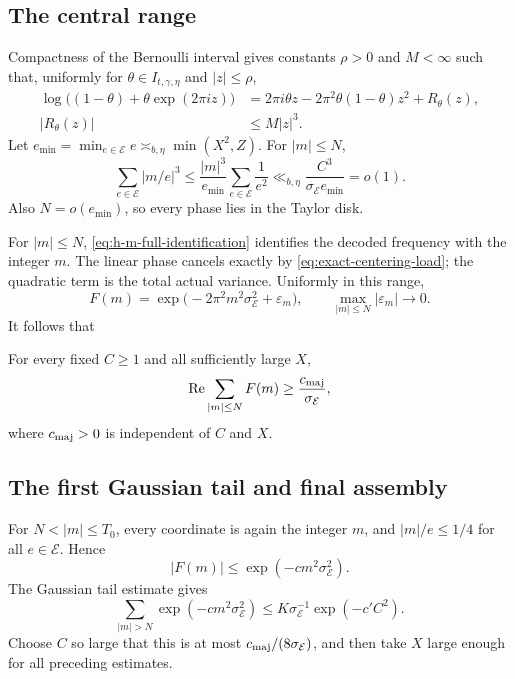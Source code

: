 \subsection{The central range}

Compactness of the Bernoulli interval gives constants $\rho>0$ and $M<\infty$ such that, uniformly for $\theta\in I_{t,\gamma,\eta}$ and $|z|\leq\rho$,
\begin{equation}
\label{eq:local-log-expansion}
\begin{aligned}
 \log\bigl((1-\theta)+\theta\exp(2\pi iz)\bigr)
 &=2\pi i\theta z-2\pi^2\theta(1-\theta)z^2+R_\theta(z),\\
 |R_\theta(z)|&\leq M|z|^3.
\end{aligned}
\end{equation}
Let $e_{\min}=\min_{e\in\mathcal E}e\asymp_{b,\eta}\min(X^2,Z)$. For $|m|\leq N$,
\[
 \sum_{e\in\mathcal E}|m/e|^3
 \leq\frac{|m|^3}{e_{\min}}\sum_{e\in\mathcal E}\frac1{e^2}
 \ll_{b,\eta}\frac{C^3}{\sigma_{\mathcal E}e_{\min}}=o(1).
\]
Also $N=o(e_{\min})$, so every phase lies in the Taylor disk.

For $|m|\leq N$, \cref{eq:h-m-full-identification} identifies the decoded frequency with the integer $m$. The linear phase cancels exactly by \cref{eq:exact-centering-load}; the quadratic term is the total actual variance. Uniformly in this range,
\begin{equation}
\label{eq:major-local-gaussian}
 F(m)=\exp\bigl(-2\pi^2m^2\sigma_{\mathcal E}^2+\varepsilon_m\bigr),
 \qquad \max_{|m|\leq N}|\varepsilon_m|\to0.
\end{equation}
It follows that
\begin{proposition}
\label{prop:positive-major}
For every fixed $C\geq1$ and all sufficiently large $X$,
\begin{equation}
\label{eq:positive-major}
 \operatorname{Re}\sum_{|m|\leq N}F(m)\geq\frac{c_{\rm maj}}{\sigma_{\mathcal E}},
\end{equation}
where $c_{\rm maj}>0$ is independent of $C$ and $X$.
\end{proposition}

\subsection{The first Gaussian tail and final assembly}

For $N<|m|\leq T_0$, every coordinate is again the integer $m$, and $|m|/e\leq1/4$ for all $e\in\mathcal E$. Hence
\[
 |F(m)|\leq\exp(-cm^2\sigma_{\mathcal E}^2).
\]
The Gaussian tail estimate gives
\begin{equation}
\label{eq:range-II-tail}
 \sum_{|m|>N}\exp(-cm^2\sigma_{\mathcal E}^2)
 \leq K\sigma_{\mathcal E}^{-1}\exp(-c'C^2).
\end{equation}
Choose $C$ so large that this is at most $c_{\rm maj}/(8\sigma_{\mathcal E})$, and then take $X$ large enough for all preceding estimates.

